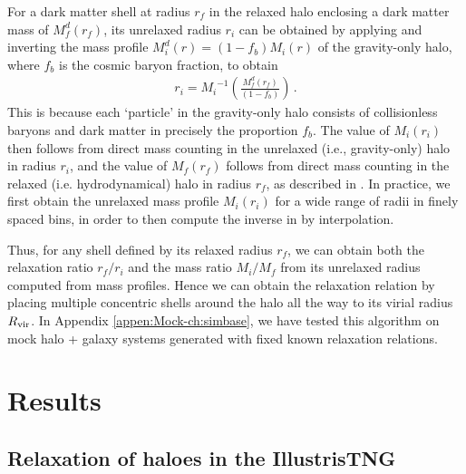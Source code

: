 For a dark matter shell at radius $r_f$ in the relaxed halo enclosing a dark matter mass of $M_f^d(r_f)$, its unrelaxed radius $r_i$ can be obtained by applying  and inverting the mass profile $M_i^d(r)=(1-f_b) M_i(r)$ of the gravity-only halo, where $f_b$ is the cosmic baryon fraction, to obtain 
\begin{align}
\label{eq:inv-mass-ch:simbase}
r_i = {M_i}^{-1} \left( \frac{M_f^d(r_f)}{(1-f_b)} \right)\,.
\end{align}
This is because each `particle' in the gravity-only halo consists of collisionless baryons and dark matter in precisely the proportion $f_{b}$. 
The value of $M_i(r_i)$ then follows from direct mass counting in the unrelaxed (i.e., gravity-only) halo in radius $r_i$, and the value of $M_f(r_f)$ follows from direct mass counting in the relaxed (i.e. hydrodynamical) halo in radius $r_f$, as described in . In practice, we first obtain the unrelaxed mass profile $M_i(r_i)$ for a wide range of radii in finely spaced bins, in order to then compute the inverse in  by interpolation.

Thus, for any shell defined by its relaxed radius $r_f$, we can obtain both the relaxation ratio $r_f/r_i$ and the mass ratio $M_i/M_f$ from its unrelaxed radius computed from mass profiles. Hence we can obtain the relaxation relation by placing multiple concentric shells around the halo all the way to its virial radius $R_{\rm{vir}}$.
In Appendix \ref{appen:Mock-ch:simbase}, we have tested this algorithm on mock halo + galaxy systems generated with fixed known relaxation relations.









\section{Results}
\label{sec:results-ch:simbase}


\subsection{Relaxation of haloes in the IllustrisTNG}
\label{sec:results-1-ch:simbase}


